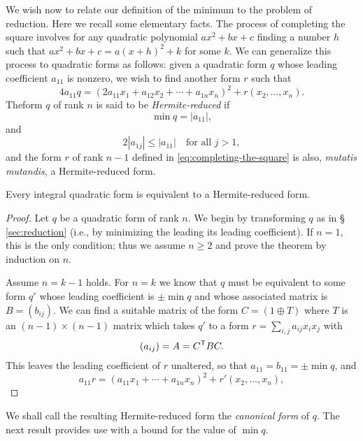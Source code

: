 We wish now to relate our definition of the minimum to the problem of reduction.
Here we recall some elementary facts. The process of completing the square
involves for any quadratic polynomial \(ax^2 + bx + c\) finding a number \(h\)
such that \(ax^2 + bx + c = a(x + h)^2 + k\) for some \(k\). We can generalize
this process to quadratic forms as follows: given a quadratic form \(q\) whose
leading coefficient \(a_{11}\) is nonzero, we wish to find another form \(r\)
such that
\begin{equation}
  \label{eq:completing-the-square}
  4a_{11}q = (2a_{11}x_1 + a_{12}x_2 + \cdots + a_{1n}x_n)^2 + r(x_2, \dots, x_n).
\end{equation}
Theform \(q\) of rank \(n\) is said to be \emph{Hermite-reduced} if
\[
  \min q = |a_{11}|,
\]
and
\[
  2|a_{1j}| \leq |a_{11}| \quad \text{for all } j > 1,
\]
and the form \(r\) of rank \(n - 1\) defined in \eqref{eq:completing-the-square} is
also, \emph{mutatis mutandis}, a Hermite-reduced form.

\begin{theoremx}
  {\normalfont \cite[p.~18ff]{watson1960integral}} Every integral quadratic form
  is equivalent to a Hermite-reduced form.
\end{theoremx}

\begin{proof}
  Let \(q\) be a quadratic form of rank \(n\). We begin by transforming \(q\) as
  in \S\,\ref{sec:reduction} (i.e., by minimizing the leading its leading
  coefficient). If \(n = 1\), this is the only condition; thus we assume \(n
  \geq 2\) and prove the theorem by induction on \(n\).

  Assume \(n = k - 1\) holds. For \(n = k\) we know that \(q\) must be
  equivalent to some form \(q'\) whose leading coefficient is \(\pm \min q\) and
  whose associated matrix is \(B = (b_{ij})\). We can find a suitable matrix of
  the form \(C = (1 \oplus T)\) where \(T\) is an \((n - 1) \times (n-1)\)
  matrix which takes \(q'\) to a form \(r = \sum_{i,j} a_{ij} x_i x_j\) with
  \[(a_{ij}) = A = C^{\mathsf{T}}BC.\] This leaves the leading coefficient of \(r\)
  unaltered, so that \(a_{11} = b_{11} = \pm \min q\), and
  \[
    a_{11}r = (a_{11}x_1 + \cdots + a_{1n}x_n)^2 + r'(x_2, \dots, x_n),
  \]
\end{proof}

We shall call the resulting Hermite-reduced form the \emph{canonical form} of
\(q\). The next result provides use with a bound for the value of \(\min q\).


